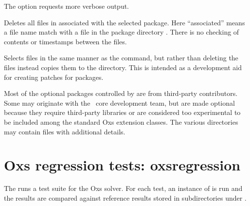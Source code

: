 \begin{description}
  The  option requests more verbose output.
\item[\optkey{uninstall pkg [pkg \ldots]}]
 Deletes all files in  associated with the
 selected package.  Here ``associated'' means a file name match with a
 file in the package directory .
 There is no checking of contents or timestamps between the files.
\item[\optkey{copyout pkg [pkg \ldots] destination}]
  Selects files in the same manner as the  command, but
  rather than deleting the files instead copies them to the
   directory.  This is intended as a development aid
  for creating patches for packages.
\end{description}
Most of the optional packages controlled by  are from
third-party contributors.  Some may originate with the \OOMMF\ core
development team, but are made optional because they require third-party
libraries or are considered too experimental to be included among the
standard Oxs extension classes.  The various
 directories may contain
 files with additional details.


\section{Oxs regression tests:
            oxsregression\label{sec:oxsregression}}%

The  runs a test suite for the Oxs solver.  For
each test, an instance of
is run and the results are compared against reference results stored
in subdirectories under .


